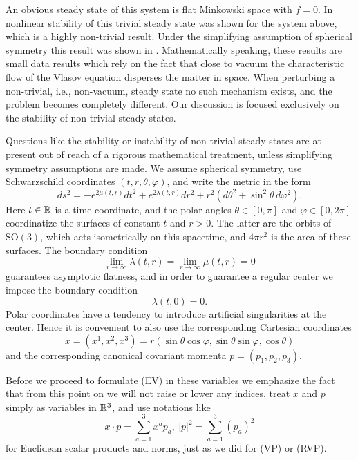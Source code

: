 \documentclass[11pt]{article}
\begin{document}
An obvious steady state of this system is flat Minkowski space with $f=0$.
In \cite{FaJoSm,LiTa19,taylor} nonlinear stability of this trivial
steady state was shown for the system above, which is a highly non-trivial
result.
Under the simplifying assumption of spherical symmetry this result
was shown in \cite{Rein95,RR92a}. Mathematically speaking, these results
are small data results which rely on the fact that close to vacuum
the characteristic flow of the Vlasov equation disperses the
matter in space. When perturbing a non-trivial, i.e., non-vacuum, steady state
no such mechanism exists, and the problem becomes completely
different. Our discussion is focused exclusively on the stability
of non-trivial steady states.

Questions like the stability or instability of
non-trivial steady states are at present out of reach
of a rigorous mathematical treatment, unless simplifying symmetry
assumptions are made. We assume spherical symmetry, use
Schwarzschild coordinates $(t,r,\theta,\varphi)$, and write
the metric in the form
\begin{equation} \label{metric}
  ds^2=-e^{2\mu(t,r)}dt^2+e^{2\lambda(t,r)}dr^2+
  r^2(d\theta^2+\sin^2\theta\,d\varphi^2).
\end{equation}
Here $t\in \mathbb R$ is a time coordinate,
and the polar angles $\theta\in [0,\pi]$ and $\varphi\in [0,2\pi]$
coordinatize the surfaces of constant $t$ and $r>0$.
The latter are the orbits
of $\mathrm {SO}(3)$, which acts isometrically on this spacetime, and
$4 \pi r^2$ is the area of these surfaces. The boundary condition
\begin{equation}\label{boundcinf}
  \lim_{r\to\infty}\lambda(t, r)=\lim_{r\to\infty}\mu(t, r)=0
\end{equation}
guarantees asymptotic flatness, and in order to guarantee a regular center
we impose the boundary condition
\begin{equation}\label{boundc0}
  \lambda(t,0)=0.
\end{equation}
Polar coordinates have a tendency to introduce artificial singularities at
the center. Hence it is convenient to also use the corresponding Cartesian
coordinates
\[
x = (x^1,x^2,x^3) =
r (\sin \theta \cos \varphi,\sin \theta \sin \varphi,
\cos \theta)
\]
and the corresponding canonical covariant momenta $p=(p_1,p_2,p_3)$.

Before we proceed to formulate (EV) in these variables we emphasize
the fact that from this point on we will not raise or lower any indices,
treat $x$ and $p$ simply as variables in $\mathbb R^3$, and use notations
like
\[
x\cdot p = \sum_{a=1}^3 x^a p_a,\ |p|^2 = \sum_{a=1}^3 (p_a)^2
\]
for Euclidean scalar products and norms, just as we did for (VP) or (RVP).
\end{document}
